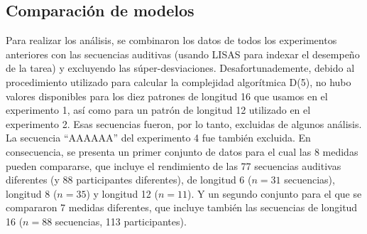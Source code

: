  \subsection{Comparación de modelos}
 
 
 Para realizar los análisis, se combinaron los datos de todos los experimentos anteriores con las secuencias auditivas (usando LISAS para indexar el desempeño de la tarea) y excluyendo las súper-desviaciones. Desafortunademente, debido al procedimiento utilizado para calcular la complejidad algorítmica D(5), no hubo valores disponibles para los diez patrones de longitud 16 que usamos en el experimento 1, así como para un patrón de longitud 12 utilizado en el experimento 2. Esas secuencias fueron, por lo tanto, excluidas de algunos análisis. La secuencia ``AAAAAA'' del experimento 4 fue también excluida. En consecuencia, se presenta un primer conjunto de datos para el cual las 8 medidas pueden compararse, que incluye el rendimiento de las 77 secuencias auditivas diferentes (y 88 participantes diferentes), de longitud 6 ($n = 31$ secuencias), longitud 8 ($n = 35$) y longitud 12 ($n= 11$). Y un segundo conjunto para el que se compararon 7 medidas diferentes, que incluye también las secuencias de longitud 16 ($n = 88$ secuencias, 113 participantes).
 
